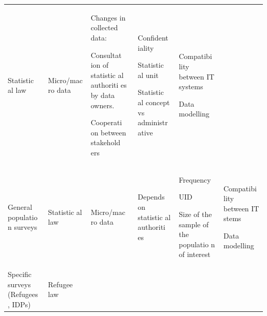 \documentclass[
]{article}
\begin{document}
\begin{longtable}[]{@{}llllll@{}}
\begin{minipage}[t]{0.14\columnwidth}
Statistic
al
law\strut
\end{minipage} & \begin{minipage}[t]{0.14\columnwidth}\raggedright
Micro/mac
ro
data\strut
\end{minipage} & \begin{minipage}[t]{0.14\columnwidth}\raggedright
Changes
in
collected
data:

Consultat
ion
of
statistic
al
authoriti
es
by data
owners.

Cooperati
on
between
stakehold
ers\strut
\end{minipage} & \begin{minipage}[t]{0.14\columnwidth}\raggedright
Confident
iality

Statistic
al
unit

Statistic
al
concept
vs
administr
ative\strut
\end{minipage} & \begin{minipage}[t]{0.14\columnwidth}\raggedright
Compatibi
lity
between
IT
systems

Data
modelling\strut
\end{minipage}\tabularnewline
\begin{minipage}[t]{0.14\columnwidth}\raggedright
General
populatio
n
surveys\strut
\end{minipage} & \begin{minipage}[t]{0.14\columnwidth}\raggedright
Statistic
al
law\strut
\end{minipage} & \begin{minipage}[t]{0.14\columnwidth}\raggedright
Micro/mac
ro
data\strut
\end{minipage} & \begin{minipage}[t]{0.14\columnwidth}\raggedright
Depends
on
statistic
al
authoriti
es\strut
\end{minipage} & \begin{minipage}[t]{0.14\columnwidth}\raggedright
Frequency

UID

Size of
the
sample of
the
populatio
n
of
interest\strut
\end{minipage} & \begin{minipage}[t]{0.14\columnwidth}\raggedright
Compatibi
lity
between
IT stems

Data
modelling\strut
\end{minipage}\tabularnewline
\begin{minipage}[t]{0.14\columnwidth}\raggedright
Specific
surveys
(Refugees
,
IDPs)\strut
\end{minipage} & \begin{minipage}[t]{0.14\columnwidth}\raggedright
Refugee
law


\end{minipage}
\end{longtable}
\end{document}
